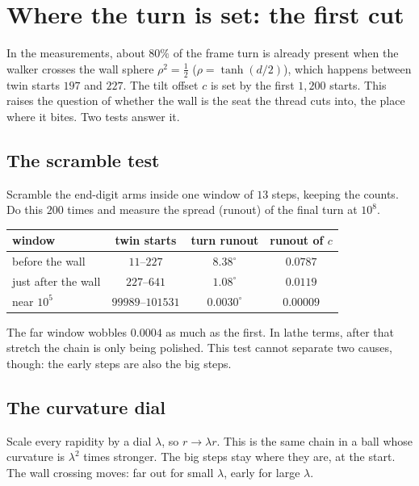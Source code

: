\section{Where the turn is set: the first cut}\label{sec:firstcut}

In the measurements, about $80\%$ of the frame turn is already present when the walker crosses the wall sphere $\rho^2=\tfrac12$ ($\rho=\tanh(d/2)$), which happens between twin starts $197$ and $227$. The tilt offset $c$ is set by the first $1{,}200$ starts. This raises the question of whether the wall is the seat the thread cuts into, the place where it bites. Two tests answer it.

\subsection{The scramble test} 
Scramble the end-digit arms inside one window of $13$ steps, keeping the counts. Do this $200$ times and measure the spread (runout) of the final turn at $10^8$.

\begin{center}\begin{tabular}{lccc}
\toprule
window & twin starts & turn runout & runout of $c$\\
\midrule
before the wall & $11$--$227$ & $8.38^\circ$ & $0.0787$\\
just after the wall & $227$--$641$ & $1.08^\circ$ & $0.0119$\\
near $10^5$ & $99989$--$101531$ & $0.0030^\circ$ & $0.00009$\\
\bottomrule
\end{tabular}\end{center}

The far window wobbles $0.0004$ as much as the first. In lathe terms, after that stretch the chain is only being polished. This test cannot separate two causes, though: the early steps are also the big steps.

\subsection{The curvature dial} 
Scale every rapidity by a dial $\lambda$, so $r\to\lambda r$. This is the same chain in a ball whose curvature is $\lambda^2$ times stronger. The big steps stay where they are, at the start. The wall crossing moves: far out for small $\lambda$, early for large $\lambda$.

